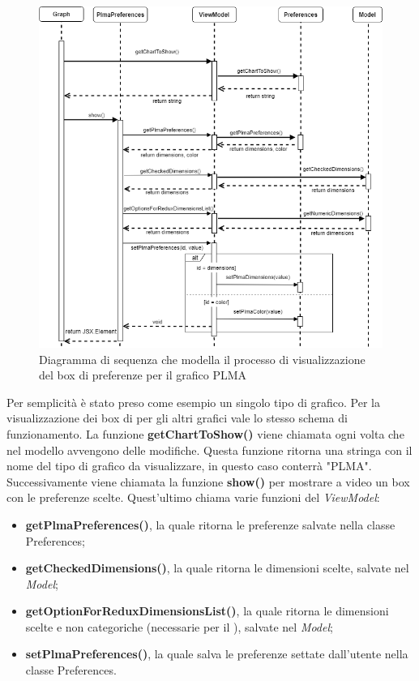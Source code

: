 \begin{figure}[hb]
\includegraphics[width=14cm]{Images/Allegato Tecnico-Sequenza-PLMApref}
\centering
\caption{Diagramma di sequenza che modella il processo di visualizzazione del box di preferenze per il grafico PLMA}
\end{figure}
Per semplicità è stato preso come esempio un singolo tipo di grafico. Per la visualizzazione dei box di  per gli altri grafici vale lo stesso schema di funzionamento.
La funzione \textbf{getChartToShow()} viene chiamata ogni volta che nel modello avvengono delle modifiche. Questa funzione ritorna una stringa con il nome del tipo di grafico da visualizzare, in questo caso conterrà "PLMA".
Successivamente viene chiamata la funzione \textbf{show()} per mostrare a video un box con le preferenze scelte. Quest'ultimo chiama varie funzioni del \textit{ViewModel}:
\begin{itemize}
\item \textbf{getPlmaPreferences()}, la quale ritorna le preferenze salvate nella classe Preferences;
\item \textbf{getCheckedDimensions()}, la quale ritorna le dimensioni scelte, salvate nel \textit{Model};
\item \textbf{getOptionForReduxDimensionsList()}, la quale ritorna le dimensioni scelte e non categoriche (necessarie per il ), salvate nel \textit{Model};
\item \textbf{setPlmaPreferences()}, la quale salva le preferenze settate dall'utente nella classe Preferences.
\end{itemize}
